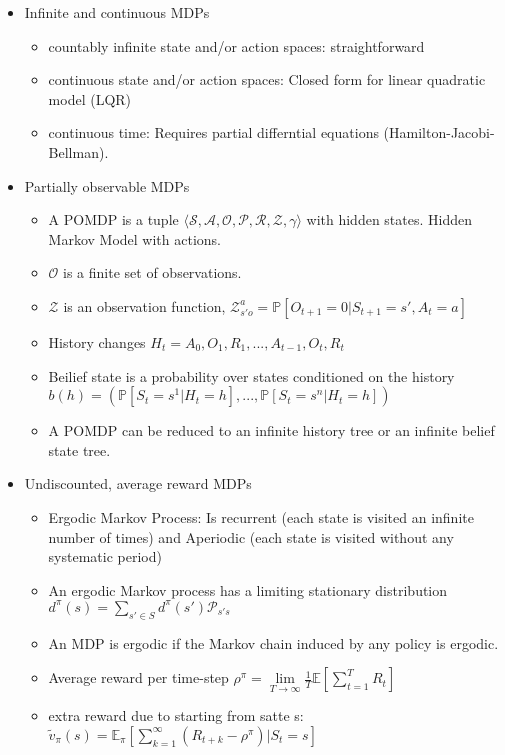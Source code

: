 \begin{itemize}[noitemsep,nolistsep]
\begin{itemize}
\begin{itemize}
		\end{itemize}
	\end{itemize}
	\item Infinite and continuous MDPs
	\begin{itemize}[noitemsep,nolistsep]
		\item countably infinite state and/or action spaces: straightforward
		\item continuous state and/or action spaces: Closed form for linear quadratic model (LQR)
		\item continuous time: Requires partial differntial equations (Hamilton-Jacobi-Bellman).
	\end{itemize}
	\item Partially observable MDPs
	\begin{itemize}[noitemsep,nolistsep]
		\item A POMDP is a tuple $\langle \mathcal{S,A,O,P,R,Z},\gamma \rangle$ with hidden states. Hidden Markov Model with actions.
		\item $\mathcal{O}$ is a finite set of observations.
		\item $\mathcal{Z}$ is an observation function, $\mathcal{Z}_{s'o}^a = \mathbb{P}[O_{t+1} = 0 | S_{t+1} = s', A_t = a]$
		\item History changes $H_t = A_0,O_1,R_1,...,A_{t-1},O_t,R_t$
		\item Beilief state is a probability over states conditioned on the history $b(h) = (\mathbb{P}[S_t = s^1 | H_t = h],...,\mathbb{P}[S_t = s^n | H_t = h])$
		\item A POMDP can be reduced to an infinite history tree or an infinite belief state tree.
	\end{itemize}
	\item Undiscounted, average reward MDPs
	\begin{itemize}[noitemsep,nolistsep]
		\item Ergodic Markov Process: Is recurrent (each state is visited an infinite number of times) and Aperiodic (each state is visited without any systematic period)
		\item An ergodic Markov process has a limiting stationary distribution $d^\pi(s) = \sum_{s' \in S}d^\pi(s')\mathcal{P}_{s's}$ 
		\item An MDP is ergodic if the Markov chain induced by any policy is ergodic.
		\item Average reward per time-step $\rho^\pi = \underset{T \rightarrow \infty}{\lim} \frac{1}{T} \mathbb{E}[\sum_{t=1}^T R_t] $
		\item extra reward due to starting from satte s: $\tilde{v}_\pi(s) = \mathbb{E}_\pi [\sum_{k=1}^\infty (R_{t+k} - \rho^\pi) | S_t = s]$
	\end{itemize}
\end{itemize} 
